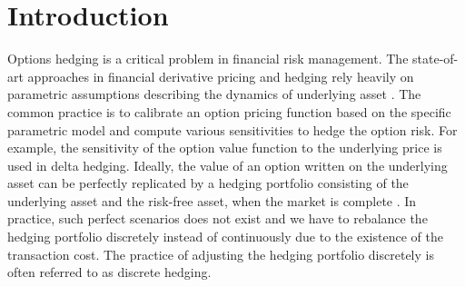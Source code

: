 \documentclass[letterpaper,12pt,titlepage,oneside,final]{book}
\numberwithin{equation}{section}
\theoremstyle{definition}
\begin{document}


\chapter{Introduction}
Options hedging is a critical problem in financial risk management. The state-of-art approaches in financial derivative pricing and hedging rely heavily on parametric assumptions describing the dynamics of underlying asset .  The common practice is to calibrate an option pricing function based on the specific parametric model and compute various sensitivities to hedge the option risk. For example, the sensitivity of the option value function to the underlying price is used in delta hedging. Ideally, the value of an option written on the underlying asset can be perfectly replicated by a hedging portfolio consisting of the underlying asset and the  risk-free asset, when the market is complete \cite{shreve2004stochastic}.  In practice, such perfect scenarios does not exist and we have to rebalance the hedging portfolio discretely instead of continuously due to the existence of the transaction cost.  The practice of adjusting the hedging portfolio discretely is often referred to as discrete hedging.
\end{document}
